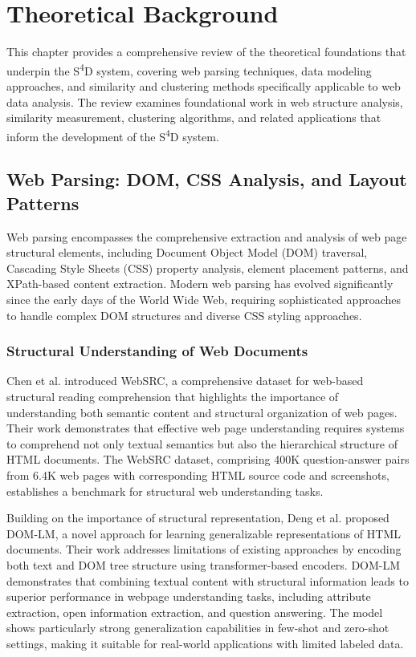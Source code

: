 \chapter{Theoretical Background}
\label{ch:theoretical-background}

This chapter provides a comprehensive review of the theoretical foundations that underpin the S\textsuperscript{4}D system, covering web parsing techniques, data modeling approaches, and similarity and clustering methods specifically applicable to web data analysis. The review examines foundational work in web structure analysis, similarity measurement, clustering algorithms, and related applications that inform the development of the S\textsuperscript{4}D system.

\section{Web Parsing: DOM, CSS Analysis, and Layout Patterns}
\label{sec:web-parsing-theory}

Web parsing encompasses the comprehensive extraction and analysis of web page structural elements, including Document Object Model (DOM) traversal, Cascading Style Sheets (CSS) property analysis, element placement patterns, and XPath-based content extraction. Modern web parsing has evolved significantly since the early days of the World Wide Web, requiring sophisticated approaches to handle complex DOM structures and diverse CSS styling approaches.

\subsection{Structural Understanding of Web Documents}

Chen et al. \cite{chen2021websrc} introduced WebSRC, a comprehensive dataset for web-based structural reading comprehension that highlights the importance of understanding both semantic content and structural organization of web pages. Their work demonstrates that effective web page understanding requires systems to comprehend not only textual semantics but also the hierarchical structure of HTML documents. The WebSRC dataset, comprising 400K question-answer pairs from 6.4K web pages with corresponding HTML source code and screenshots, establishes a benchmark for structural web understanding tasks.

Building on the importance of structural representation, Deng et al. \cite{deng2022domlm} proposed DOM-LM, a novel approach for learning generalizable representations of HTML documents. Their work addresses limitations of existing approaches by encoding both text and DOM tree structure using transformer-based encoders. DOM-LM demonstrates that combining textual content with structural information leads to superior performance in webpage understanding tasks, including attribute extraction, open information extraction, and question answering. The model shows particularly strong generalization capabilities in few-shot and zero-shot settings, making it suitable for real-world applications with limited labeled data.

